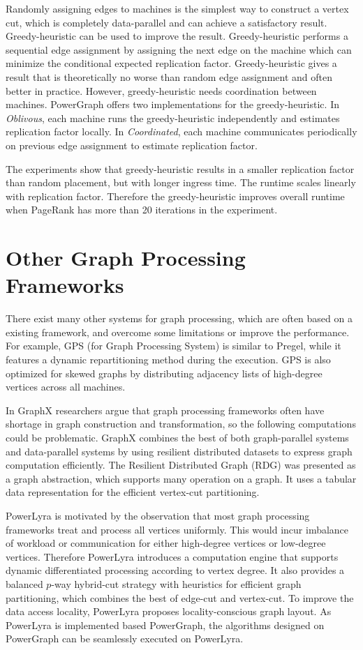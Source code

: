 Randomly assigning edges to machines is the simplest way to construct a vertex cut, which is completely data-parallel and can achieve a satisfactory result. Greedy-heuristic can be used to improve the result. Greedy-heuristic performs a sequential edge assignment by assigning the next edge on the machine which can minimize the conditional expected replication factor. Greedy-heuristic gives a result that is theoretically no worse than random edge assignment and often better in practice. However, greedy-heuristic needs coordination between machines. PowerGraph offers two implementations for the greedy-heuristic. In \textit{Oblivous}, each machine runs the greedy-heuristic independently and estimates replication factor locally. In \textit{Coordinated}, each machine communicates periodically on previous edge assignment to estimate replication factor.

The experiments show that greedy-heuristic results in a smaller replication factor than random placement, but with longer ingress time. The runtime scales linearly with replication factor. Therefore the greedy-heuristic improves overall runtime when PageRank has more than 20 iterations in the experiment.

\section{Other Graph Processing Frameworks}

There exist many other systems for graph processing, which are often based on a existing framework, and overcome some limitations or improve the performance. For example, GPS (for Graph Processing System)\cite{salihoglu2013gps} is similar to Pregel, while it features a dynamic repartitioning method during the execution. GPS is also optimized for skewed graphs by distributing adjacency lists of high-degree vertices across all machines.

In GraphX\cite{xin2013graphx} researchers argue that graph processing frameworks often have shortage in graph construction and transformation, so the following computations could be problematic. GraphX combines the best of both graph-parallel systems and data-parallel systems by using resilient distributed datasets to express graph computation efficiently. The Resilient Distributed Graph (RDG) was presented as a graph abstraction, which supports many operation on a graph. It uses a tabular data representation for the efficient vertex-cut partitioning. 

PowerLyra\cite{chen2015powerlyra} is motivated by the observation that most graph processing frameworks treat and process all vertices uniformly. This would incur imbalance of workload or communication for either high-degree vertices or low-degree vertices. Therefore PowerLyra introduces a computation engine that supports dynamic differentiated processing according to vertex degree. It also provides a balanced $p$-way hybrid-cut strategy with heuristics for efficient graph partitioning, which combines the best of edge-cut and vertex-cut. To improve the data access locality, PowerLyra proposes locality-conscious graph layout. As PowerLyra is implemented based PowerGraph, the algorithms designed on PowerGraph can be seamlessly executed on PowerLyra.




